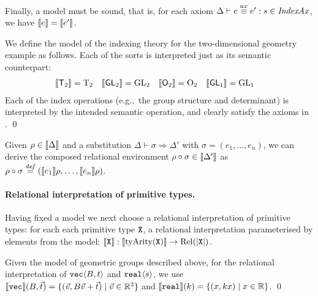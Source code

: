 Finally, a model
must be sound, that is, for each axiom $\Delta \vdash e \stackrel{ax}\equiv e' : s \in
\mathit{IndexAx}$, we have $\llbracket e \rrbracket = \llbracket e' \rrbracket$. 

\begin{example*}
We define the model
of the indexing theory for the two-dimensional
geometry example as follows. Each of the sorts is interpreted just as
its semantic counterpart: 
\begin{align*}
\llbracket \mathsf{T}_2 \rrbracket & = \mathrm{T}_2
&\llbracket \mathsf{GL}_2 \rrbracket & = \mathrm{GL}_2 &
\llbracket \mathsf{O}_2 \rrbracket & = \mathrm{O}_2
&\llbracket \mathsf{GL}_1 \rrbracket & = \mathrm{GL}_1
\end{align*}
Each of the index operations (e.g.,~the group structure and
determinant) is interpreted by the intended semantic operation, and
clearly satisfy the axioms in . 
\qed
\end{example*}

Given $\rho \in \llbracket \Delta \rrbracket$ and a substitution
$\Delta \vdash \sigma \Rightarrow \Delta'$ with $\sigma = (e_1,\ldots,e_n)$, 
we can derive the composed
relational environment $\rho \circ \sigma
\in \llbracket \Delta' \rrbracket$ as $\rho \circ \sigma \stackrel{\mathit{def}}= (\llbracket e_1 \rrbracket\rho,\ldots,\llbracket e_n \rrbracket\rho)$.


\paragraph{Relational interpretation of primitive types.}
Having fixed a model
we next choose a relational interpretation 
of
primitive types: for each each primitive type
$\textup{\texttt{X}}$, a relational interpretation parameterised by elements
from the model: $\llbracket \textup{\texttt{X}} \rrbracket :
\llbracket \mathrm{tyArity}(\textup{\texttt{X}}) \rrbracket \to \mathrm{Rel}(\left| \textup{\texttt{X}}\right|)$. 

\begin{example*}
Given the model of geometric groups described above,
for the relational interpretation  of $\textup{\texttt{vec}}\langle B,t \rangle$ and
$\textup{\texttt{real}}\langle s \rangle$, we use $\llbracket \textup{\texttt{vec}} \rrbracket(B,\vec{t}) = \{
(\vec{v}, B\vec{v} + \vec{t}) \mathrel| \vec{v} \in \mathbb{R}^2 \}$ and
$\llbracket \textup{\texttt{real}} \rrbracket(k) = \{ (x, kx) \mathrel| x \in \mathbb{R} \}$.
\qed
\end{example*}

